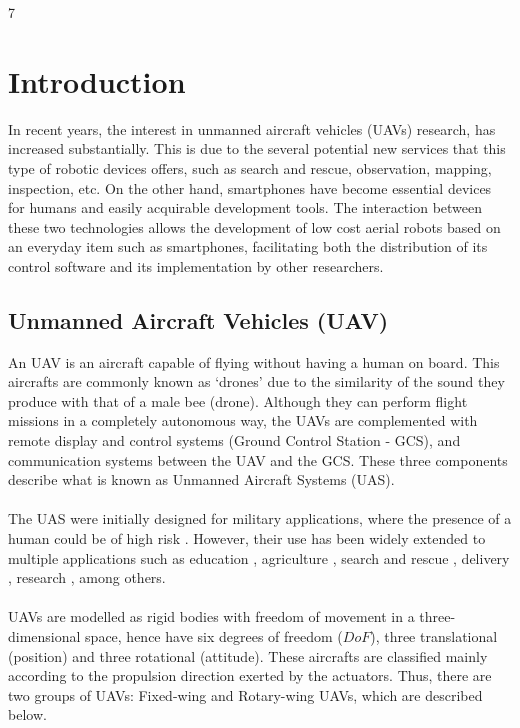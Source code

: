 7\chapter{Introduction} \label{ch:introduction}
In recent years, the interest in unmanned aircraft vehicles (UAVs) research, has increased substantially. This is due to the several potential new services that this type of robotic devices offers, such as search and rescue, observation, mapping, inspection, etc. On the other hand, smartphones have become essential devices for humans and easily acquirable development tools. The interaction between these two technologies allows the development of low cost aerial robots based on an everyday item such as smartphones, facilitating both the distribution of its control software and its implementation by other researchers.

\section{Unmanned Aircraft Vehicles (UAV)}
An UAV is an aircraft capable of flying without having a human on board. This aircrafts are commonly known as `drones' due to the similarity of the sound they produce with that of a male bee (drone). Although they can perform flight missions in a completely autonomous way, the UAVs are complemented with remote display and control systems (Ground Control Station - GCS), and communication systems between the UAV and the GCS. These three components describe what is known as Unmanned Aircraft Systems (UAS).\\\\
The UAS were initially designed for military applications, where the presence of a human could be of high risk \cite{Bouabdallah2007}. However, their use has been widely extended to multiple applications such as education \cite{Rahman2017}, agriculture \cite{Garcia2015}, search and rescue \cite{KumarS2015}, delivery \cite{Gatteschi2015}, research \cite{Gonzalez2012}, among others. 
\\\\
UAVs are modelled as rigid bodies with freedom of movement in a three-dimensional space, hence have six degrees of freedom ($DoF$), three translational (position) and three rotational (attitude). These aircrafts are classified mainly according to the propulsion direction exerted by the actuators. Thus, there are two groups of UAVs: Fixed-wing and Rotary-wing UAVs, which are described below.

